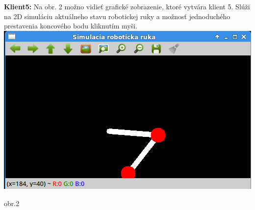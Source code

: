 \documentclass{article}
\begin{document}
\newline
\textbf{Klient5:} Na obr. 2 možno vidieť grafické zobrazenie, ktoré vytvára klient 5. Slúži na 2D simuláciu aktuálneho stavu robotickej ruky a možnosť jednoduchého prestavenia koncového bodu kliknutím myši.\newline\newline
\includegraphics[width=\linewidth]{client5.png}
\begin{center} obr.2 \end{center}
\end{document}
